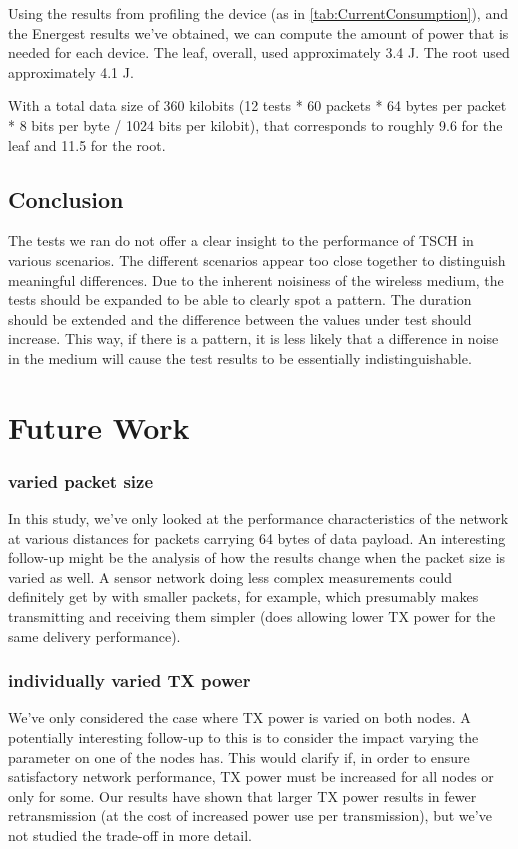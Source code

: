 \documentclass[conference]{IEEEtran}
\begin{document}
Using the results from profiling the device (as in \ref{tab:CurrentConsumption}), and the Energest results we've obtained, we can compute the amount of power that is needed for each device. The leaf, overall, used approximately 3.4 J. The root used approximately 4.1 J.

With a total data size of 360 kilobits (12 tests * 60 packets * 64 bytes per packet * 8 bits per byte / 1024 bits per kilobit), that corresponds to roughly 9.6  for the leaf and 11.5  for the root.


\subsection{Conclusion}

The tests we ran do not offer a clear insight to the performance of TSCH in various scenarios. The different scenarios appear too close together to distinguish meaningful differences. Due to the inherent noisiness of the wireless medium, the tests should be expanded to be able to clearly spot a pattern. The duration should be extended and the difference between the values under test should increase. This way, if there is a pattern, it is less likely that a difference in noise in the medium will cause the test results to be essentially indistinguishable. 


\section{Future Work}

\subsubsection{varied packet size}
In this study, we've only looked at the performance characteristics of the network at various distances for packets carrying 64 bytes of data payload. An interesting follow-up might be the analysis of how the results change when the packet size is varied as well. A sensor network doing less complex measurements could definitely get by with smaller packets, for example, which presumably makes transmitting and receiving them simpler (does allowing lower TX power for the same delivery performance). 

\subsubsection{individually varied TX power}
We've only considered the case where TX power is varied on both nodes. A potentially interesting follow-up to this is to consider the impact varying the parameter on one of the nodes has. This would clarify if, in order to ensure satisfactory network performance, TX power must be increased for all nodes or only for some. Our results have shown that larger TX power results in fewer retransmission (at the cost of increased power use per transmission), but we've not studied the trade-off in more detail.
\end{document}
